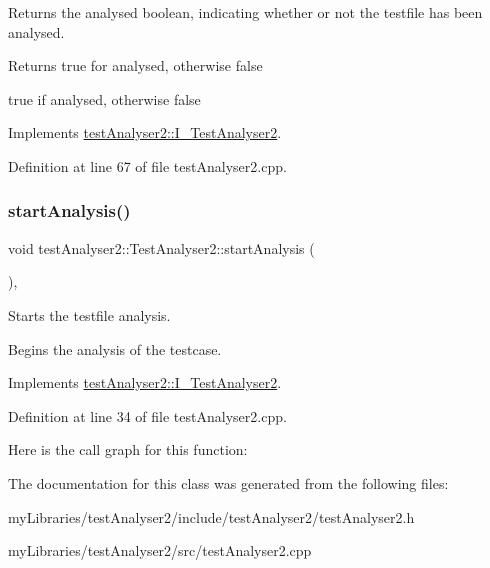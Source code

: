Returns the analysed boolean, indicating whether or not the testfile has been analysed.

\begin{DoxyReturn}{Returns}
true for analysed, otherwise false

true if analysed, otherwise false 
\end{DoxyReturn}


Implements \mbox{\hyperlink{classtestAnalyser2_1_1I__TestAnalyser2_ab0d67cf406b889585af9eaa4479540ee}{test\+Analyser2\+::\+I\+\_\+\+Test\+Analyser2}}.



Definition at line 67 of file test\+Analyser2.\+cpp.

\mbox{\label{classtestAnalyser2_1_1TestAnalyser2_a919e5ac56e1bc71dcd2d9bc7e4213125}} 
\subsubsection{\texorpdfstring{startAnalysis()}{startAnalysis()}}
{\footnotesize\ttfamily void test\+Analyser2\+::\+Test\+Analyser2\+::start\+Analysis (\begin{DoxyParamCaption}{ }\end{DoxyParamCaption})\hspace{0.3cm}{\ttfamily [override]}, {\ttfamily [virtual]}}



Starts the testfile analysis. 

Begins the analysis of the testcase. 

Implements \mbox{\hyperlink{classtestAnalyser2_1_1I__TestAnalyser2_a4b1be784ec14857fa9a72a00c3d5d542}{test\+Analyser2\+::\+I\+\_\+\+Test\+Analyser2}}.



Definition at line 34 of file test\+Analyser2.\+cpp.

Here is the call graph for this function\+:


The documentation for this class was generated from the following files\+:\begin{DoxyCompactItemize}
\item 
my\+Libraries/test\+Analyser2/include/test\+Analyser2/test\+Analyser2.\+h\item 
my\+Libraries/test\+Analyser2/src/test\+Analyser2.\+cpp\end{DoxyCompactItemize}
